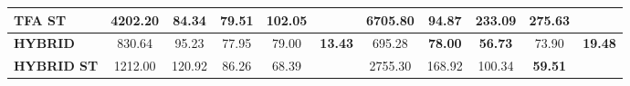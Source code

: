 \documentclass[ecp,tc, english]{iiufrgs}
\begin{document}
\begin{table}[H]
{\begin{tabular}{|l|c|c|c|c|c|c|c|c|c|c|}
\textbf{TFA ST}                            & 4202.20          & 84.34           & 79.51           & 102.05          &                                 & \textbf{6705.80} & 94.87           & 233.09          & \textbf{275.63} &                                  \\ \hline
\textbf{HYBRID}                            & 830.64           & 95.23           & 77.95           & 79.00           & \multirow{2}{*}{\textbf{13.43}} & 695.28           & \textbf{78.00}  & \textbf{56.73}  & 73.90           & \multirow{2}{*}{\textbf{19.48}}  \\ \cline{1-5} \cline{7-10}
\textbf{HYBRID ST}                         & 1212.00          & 120.92          & 86.26           & 68.39           &                                 & 2755.30          & 168.92          & 100.34          & \textbf{59.51}  &                                  \\ \hline
\end{tabular}%
}
\end{table}
\end{document}
